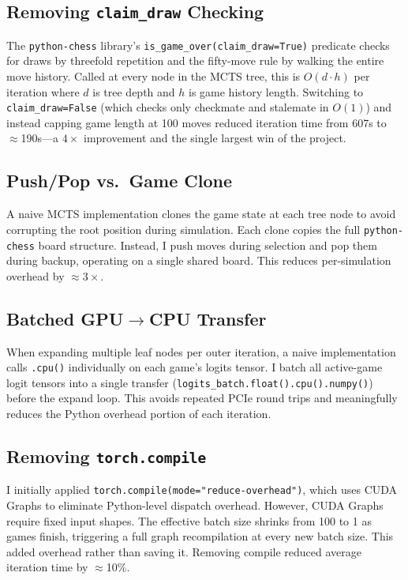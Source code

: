 \documentclass[conference]{IEEEtran}
\begin{document}
\subsection{Removing \texttt{claim\_draw} Checking}
\label{sec:claimdraw}

The \texttt{python-chess} library's \texttt{is\_game\_over(claim\_draw=True)}
predicate checks for draws by threefold repetition and the fifty-move rule by
walking the entire move history. Called at every node in the MCTS tree, this
is $O(d \cdot h)$ per iteration where $d$ is tree depth and $h$ is game
history length. Switching to \texttt{claim\_draw=False} (which checks only
checkmate and stalemate in $O(1)$) and instead capping game length at 100
moves reduced iteration time from 607s to $\approx$190s---a $4\times$
improvement and the single largest win of the project.

\subsection{Push/Pop vs.\ Game Clone}
\label{sec:pushpop}

A naive MCTS implementation clones the game state at each tree node to avoid
corrupting the root position during simulation. Each clone copies the full
\texttt{python-chess} board structure. Instead, I push moves during selection
and pop them during backup, operating on a single shared board. This reduces
per-simulation overhead by $\approx 3\times$.

\subsection{Batched GPU$\to$CPU Transfer}
\label{sec:batch}

When expanding multiple leaf nodes per outer iteration, a naive implementation
calls \texttt{.cpu()} individually on each game's logits tensor. I batch
all active-game logit tensors into a single transfer
(\texttt{logits\_batch.float().cpu().numpy()}) before the expand loop.
This avoids repeated PCIe round trips and meaningfully reduces the Python
overhead portion of each iteration.

\subsection{Removing \texttt{torch.compile}}
\label{sec:compile}

I initially applied \texttt{torch.compile(mode="reduce-overhead")}, which
uses CUDA Graphs to eliminate Python-level dispatch overhead. However,
CUDA Graphs require fixed input shapes. The effective batch size shrinks from
100 to 1 as games finish, triggering a full graph recompilation at every
new batch size. This added overhead rather than saving it. Removing compile
reduced average iteration time by $\approx$10\%.
\end{document}
